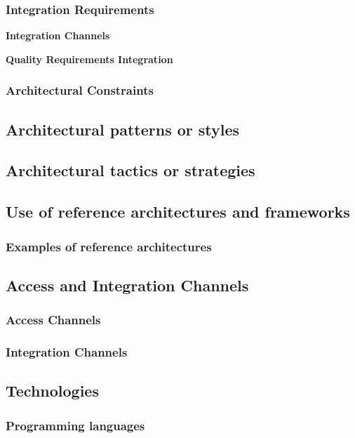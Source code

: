 \documentclass[a4paper,12pt]{article}
\begin{document}
\subsubsection{Integration Requirements}
\begin{flushleft}
\textbf{Integration Channels}

\textbf{Quality Requirements Integration}

\end{flushleft}

\subsubsection{Architectural Constraints}

\subsection{Architectural patterns or styles}
\subsection{Architectural tactics or strategies}

\newpage
\subsection{Use of reference architectures and frameworks}
\subsubsection{Examples of reference architectures}

\subsection{Access and Integration Channels}
\subsubsection{Access Channels}
\subsubsection{Integration Channels}

\newpage
\subsection{Technologies}	
	\subsubsection{Programming languages}
	
\end{document}
